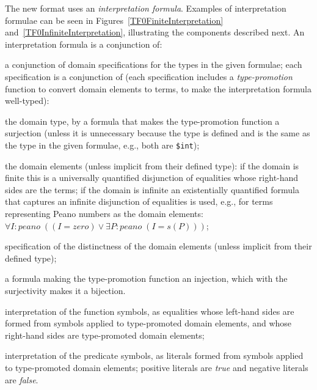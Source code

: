 \documentclass[letterpaper]{article}
\newcommand{\smalltt}[1]{\small \texttt{#1}}
\newenvironment{packed_itemize}{
\vspace*{-0.2em}
\begin{itemize}
\setlength{\partopsep}{0pt}
\setlength{\itemsep}{1pt}
\setlength{\parskip}{0pt}
\setlength{\parsep}{0pt}
}{\end{itemize}}
\begin{document}
The new format uses an {\em interpretation formula}. 
Examples of interpretation formulae can be seen in Figures~\ref{TF0FiniteInterpretation}
and~\ref{TF0InfiniteInterpretation}, illustrating the components described next. 
An interpretation formula is a conjunction of:
\begin{packed_itemize}
\item a conjunction of domain specifications for the types in the given formulae;
      each specification is a conjunction of (each specification includes a {\em type-promotion} 
      function to convert domain elements to terms, to make the interpretation formula well-typed):
      \begin{packed_itemize}
      \item the domain type, by a formula that makes the type-promotion function a surjection 
            (unless it is unnecessary because the type is defined and is the same as the type in 
            the given formulae, e.g., both are {\smalltt{\$int}});
      \item the domain elements (unless implicit from their defined type): if the domain is
            finite this is a universally quantified disjunction of equalities whose right-hand 
            sides are the terms; if the domain is infinite an existentially quantified formula 
            that captures an infinite disjunction of equalities is used, e.g., for terms 
            representing Peano numbers as the domain elements:\\
            \hspace*{0.5cm}$\forall I{:}peano\;((I = zero) \vee \exists P{:}peano\;(I = s(P)))$;
      \item specification of the distinctness of the domain elements (unless implicit from their
            defined type);
      \item a formula making the type-promotion function an injection,
            which with the surjectivity makes it a bijection.
      \end{packed_itemize}
\item interpretation of the function symbols, as equalities whose left-hand sides are 
      formed from symbols applied to type-promoted domain elements, and whose right-hand sides 
      are type-promoted domain elements;
\item interpretation of the predicate symbols, as literals formed from symbols applied
      to type-promoted domain elements; positive literals are {\em true} and negative literals 
      are {\em false}.
\end{packed_itemize}
\end{document}
